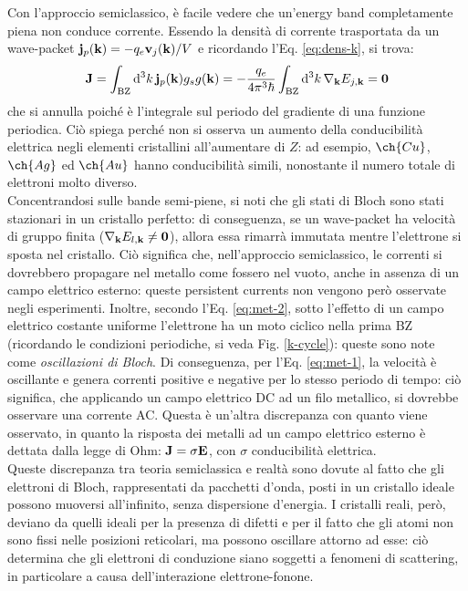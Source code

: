 Con l'approccio semiclassico, è facile vedere che un'energy band completamente piena non conduce corrente. Essendo la densità di corrente trasportata da un wave-packet $ \mathbf{j}_p(\mathbf{k}) = -q_e \mathbf{v}_j(\mathbf{k}) / V $ e ricordando l'Eq. \ref{eq:dens-k}, si trova:
\begin{equation*}
	\mathbf{J} = \int_\text{BZ} \mathrm{d}^3k\, \mathbf{j}_p(\mathbf{k}) g_s g(\mathbf{k}) = - \frac{q_e}{4\pi^3 \hbar} \int_\text{BZ} \mathrm{d}^3k\, \nabla_{\mathbf{k}} E_{j,\mathbf{k}} = \mathbf{0}
\end{equation*}
che si annulla poiché è l'integrale sul periodo del gradiente di una funzione periodica. Ciò spiega perché non si osserva un aumento della conducibilità elettrica negli elementi cristallini all'aumentare di $ Z $: ad esempio, $ \ch{Cu} $, $ \ch{Ag} $ ed $ \ch{Au} $ hanno conducibilità simili, nonostante il numero totale di elettroni molto diverso. \\
Concentrandosi sulle bande semi-piene, si noti che gli stati di Bloch sono stati stazionari in un cristallo perfetto: di conseguenza, se un wave-packet ha velocità di gruppo finita ($ \nabla_{\mathbf{k}} E_{l,\mathbf{k}} \neq \mathbf{0} $), allora essa rimarrà immutata mentre l'elettrone si sposta nel cristallo. Ciò significa che, nell'approccio semiclassico, le correnti si dovrebbero propagare nel metallo come fossero nel vuoto, anche in assenza di un campo elettrico esterno: queste persistent currents non vengono però osservate negli esperimenti.
Inoltre, secondo l'Eq. \ref{eq:met-2}, sotto l'effetto di un campo elettrico costante uniforme l'elettrone ha un moto ciclico nella prima BZ (ricordando le condizioni periodiche, si veda Fig. \ref{k-cycle}): queste sono note come \textit{oscillazioni di Bloch}. Di conseguenza, per l'Eq. \ref{eq:met-1}, la velocità è oscillante e genera correnti positive e negative per lo stesso periodo di tempo: ciò significa, che applicando un campo elettrico DC ad un filo metallico, si dovrebbe osservare una corrente AC. Questa è un'altra discrepanza con quanto viene osservato, in quanto la risposta dei metalli ad un campo elettrico esterno è dettata dalla legge di Ohm: $ \mathbf{J} = \sigma \mathbf{E} $, con $ \sigma $ conducibilità elettrica. \\
Queste discrepanza tra teoria semiclassica e realtà sono dovute al fatto che gli elettroni di Bloch, rappresentati da pacchetti d'onda, posti in un cristallo ideale possono muoversi all'infinito, senza dispersione d'energia. I cristalli reali, però, deviano da quelli ideali per la presenza di difetti e per il fatto che gli atomi non sono fissi nelle posizioni reticolari, ma possono oscillare attorno ad esse: ciò determina che gli elettroni di conduzione siano soggetti a fenomeni di scattering, in particolare a causa dell'interazione elettrone-fonone.

